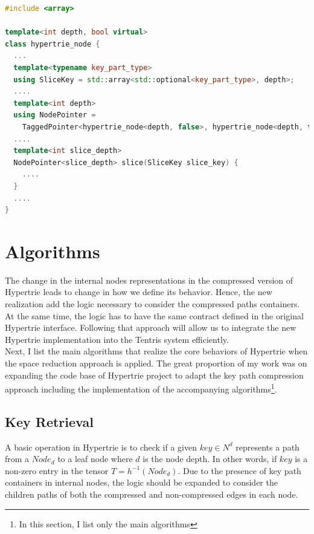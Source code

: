 \begin{lstlisting}[caption={Slicing method signituar defined for node where d = $depth$ in the space-friendly Hypertrie},label={lst:slicing_original_hypertrie},language=C++]
#include <array>

template<int depth, bool virtual>
class hypertrie_node {
  ...
  template<typename key_part_type>
  using SliceKey = std::array<std::optional<key_part_type>, depth>;
  ....
  template<int depth>
  using NodePointer = 
    TaggedPointer<hypertrie_node<depth, false>, hypertrie_node<depth, true>>;
  ....
  template<int slice_depth>
  NodePointer<slice_depth> slice(SliceKey slice_key) {
 	....
  }
  ....
}
\end{lstlisting} 



\section{Algorithms}
The change in the internal nodes representations in the compressed version of Hypertrie leads to change in how we define its behavior. 
Hence, the new realization add the logic necessary to consider the compressed paths containers. 
At the same time, the logic has to have the same contract defined in the original Hypertrie interface. 
Following that approach will allow us to integrate the new Hypertrie implementation into the Tentris system efficiently. \\

Next, I list the main algorithms that realize the core behaviors of Hypertrie when the space reduction approach is applied. The great proportion of my work was on expanding the code base of Hypertrie project to adapt the key path compression approach including the implementation of the accompanying algorithms\footnote{In this section, I list only the main algorithms}.

\subsection{Key Retrieval}
A basic operation in Hypertrie is to check if a given $key \in N^d$ represents a path from a $Node_{d}$ to a leaf node where $d$ is the node depth. In other words, if $key$ is a non-zero entry in the tensor $T = h^{-1} (Node_{d})$. Due to the presence of key path containers in internal nodes, the logic should be expanded to consider the children paths of both the compressed and non-compressed edges in each node. \\

